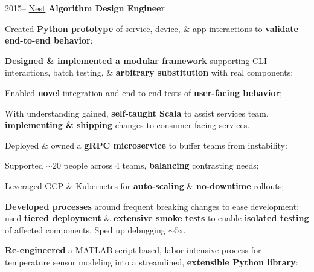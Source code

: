 \documentclass[]{friggeri-cv}
\begin{document}
\begin{entrylist}
  \entry
    {2015--}
    {\href{http://nest.com}{Nest}}
    {\textbf{Algorithm Design Engineer}}
    {
      \bodyspace
      \begin{my-itemize}
        \item Created \textbf{Python prototype} of service, device, \& app interactions to \textbf{validate end-to-end behavior}:
        \begin{my-itemize}
          \item \textbf{Designed \& implemented a modular framework} supporting CLI interactions, batch testing, \& \textbf{arbitrary substitution} with real components;
          \item Enabled \textbf{novel} integration and end-to-end tests of \textbf{user-facing behavior};
          \item With understanding gained, \textbf{self-taught Scala} to assist services team, \textbf{implementing \& shipping} changes to consumer-facing services.
        \end{my-itemize}
        \item Deployed \& owned a \textbf{gRPC microservice} to buffer teams from instability:
      
        \begin{my-itemize}
          \item Supported $\sim$20 people across 4 teams, \textbf{balancing} contrasting needs;
          \item Leveraged GCP \& Kubernetes for \textbf{auto-scaling} \& \textbf{no-downtime} rollouts;
          \item \textbf{Developed processes} around frequent breaking changes to ease development; used \textbf{tiered deployment} \& \textbf{extensive smoke tests} to enable \textbf{isolated testing} of affected components. Sped up debugging $\sim$5x.
        \end{my-itemize}
      
        \item \textbf{Re-engineered} a MATLAB script-based, labor-intensive process for temperature sensor modeling into a streamlined, \textbf{extensible Python library}:


\end{my-itemize}}
\end{entrylist}
\end{document}
